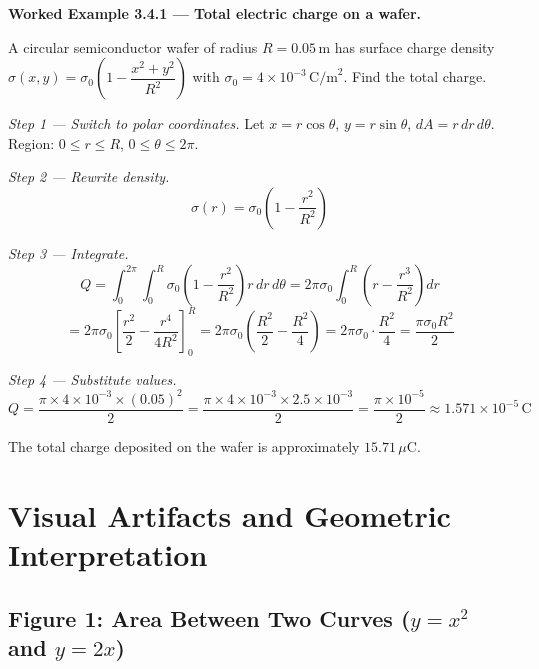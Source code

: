 \documentclass[12pt,a4paper]{article}
\begin{document}
\textbf{Worked Example 3.4.1 --- Total electric charge on a wafer.}

A circular semiconductor wafer of radius \(R = 0.05\,\text{m}\) has surface charge density \(\sigma(x,y) = \sigma_0\left(1 - \dfrac{x^2+y^2}{R^2}\right)\) with \(\sigma_0 = 4 \times 10^{-3}\,\text{C/m}^2\). Find the total charge.

\textit{Step 1 --- Switch to polar coordinates.} Let \(x = r\cos\theta\), \(y = r\sin\theta\), \(dA = r\,dr\,d\theta\). Region: \(0 \leq r \leq R\), \(0 \leq \theta \leq 2\pi\).

\textit{Step 2 --- Rewrite density.}
\[
\sigma(r) = \sigma_0\!\left(1 - \frac{r^2}{R^2}\right)
\]

\textit{Step 3 --- Integrate.}
\[
Q = \int_0^{2\pi}\int_0^{R} \sigma_0\!\left(1 - \frac{r^2}{R^2}\right) r\,dr\,d\theta
= 2\pi\sigma_0 \int_0^{R} \left(r - \frac{r^3}{R^2}\right) dr
\]
\[
= 2\pi\sigma_0 \left[\frac{r^2}{2} - \frac{r^4}{4R^2}\right]_0^{R}
= 2\pi\sigma_0 \left(\frac{R^2}{2} - \frac{R^2}{4}\right)
= 2\pi\sigma_0 \cdot \frac{R^2}{4}
= \frac{\pi\sigma_0 R^2}{2}
\]

\textit{Step 4 --- Substitute values.}
\[
Q = \frac{\pi \times 4\times10^{-3} \times (0.05)^2}{2}
= \frac{\pi \times 4\times10^{-3} \times 2.5\times10^{-3}}{2}
= \frac{\pi \times 10^{-5}}{2}
\approx 1.571 \times 10^{-5}\,\text{C}
\]

The total charge deposited on the wafer is approximately \(15.71\,\mu\text{C}\).

\section{Visual Artifacts and Geometric Interpretation}

\subsection*{Figure 1: Area Between Two Curves (\(y = x^2\) and \(y = 2x\))}

\begin{center}
\end{center}
\end{document}
